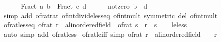 \begin{isabellebody}
\ \ \ \ \ \ Fract\ a\ b\ {\isacharless}{\kern0pt}\ Fract\ c\ d{\isachardoublequoteclose}\isanewline
\ \ \ \ \isamarkupfalse%
\ not{\isacharunderscore}{\kern0pt}zero\ {\isacartoucheopen}b\ {\isacharasterisk}{\kern0pt}\ d\ {\isachargreater}{\kern0pt}\ {}{\isacartoucheclose}\isanewline
\ \ \ \ \isamarkupfalse%
\ {\isacharparenleft}{\kern0pt}simp\ add{\isacharcolon}{\kern0pt}\ of{\isacharunderscore}{\kern0pt}rat{\isacharunderscore}{\kern0pt}rat\ of{\isacharunderscore}{\kern0pt}int{\isacharunderscore}{\kern0pt}divide{\isacharunderscore}{\kern0pt}less{\isacharunderscore}{\kern0pt}eq\ of{\isacharunderscore}{\kern0pt}int{\isacharunderscore}{\kern0pt}mult\ {\isacharbrackleft}{\kern0pt}symmetric{\isacharbrackright}{\kern0pt}\ del{\isacharcolon}{\kern0pt}\ of{\isacharunderscore}{\kern0pt}int{\isacharunderscore}{\kern0pt}mult{\isacharparenright}{\kern0pt}\isanewline
{}\isamarkupfalse%
%
\endisatagproof
{\isafoldproof}%
%
\isadelimproof
\isanewline
%
\endisadelimproof
\isanewline
{}\isamarkupfalse%
\ of{\isacharunderscore}{\kern0pt}rat{\isacharunderscore}{\kern0pt}less{\isacharunderscore}{\kern0pt}eq{\isacharcolon}{\kern0pt}\ {\isachardoublequoteopen}{\isacharparenleft}{\kern0pt}of{\isacharunderscore}{\kern0pt}rat\ r\ {\isacharcolon}{\kern0pt}{\isacharcolon}{\kern0pt}\ {\isacharprime}{\kern0pt}a{\isacharcolon}{\kern0pt}{\isacharcolon}{\kern0pt}linordered{\isacharunderscore}{\kern0pt}field{\isacharparenright}{\kern0pt}\ {\isasymle}\ of{\isacharunderscore}{\kern0pt}rat\ s\ {\isasymlongleftrightarrow}\ r\ {\isasymle}\ s{\isachardoublequoteclose}\isanewline
%
\isadelimproof
\ \ %
\endisadelimproof
%
\isatagproof
{}\isamarkupfalse%
\ le{\isacharunderscore}{\kern0pt}less\ \isamarkupfalse%
\ {\isacharparenleft}{\kern0pt}auto\ simp\ add{\isacharcolon}{\kern0pt}\ of{\isacharunderscore}{\kern0pt}rat{\isacharunderscore}{\kern0pt}less{\isacharparenright}{\kern0pt}%
\endisatagproof
{\isafoldproof}%
%
\isadelimproof
\isanewline
%
\endisadelimproof
\isanewline
{}\isamarkupfalse%
\ of{\isacharunderscore}{\kern0pt}rat{\isacharunderscore}{\kern0pt}le{\isacharunderscore}{\kern0pt}{}{\isacharunderscore}{\kern0pt}iff\ {\isacharbrackleft}{\kern0pt}simp{\isacharbrackright}{\kern0pt}{\isacharcolon}{\kern0pt}\ {\isachardoublequoteopen}{\isacharparenleft}{\kern0pt}of{\isacharunderscore}{\kern0pt}rat\ r\ {\isacharcolon}{\kern0pt}{\isacharcolon}{\kern0pt}\ {\isacharprime}{\kern0pt}a{\isacharcolon}{\kern0pt}{\isacharcolon}{\kern0pt}linordered{\isacharunderscore}{\kern0pt}field{\isacharparenright}{\kern0pt}\ {\isasymle}\ {}\ {\isasymlongleftrightarrow}\ r\ {\isasymle}\ {}{\isachardoublequoteclose}\isanewline

\end{isabellebody}
